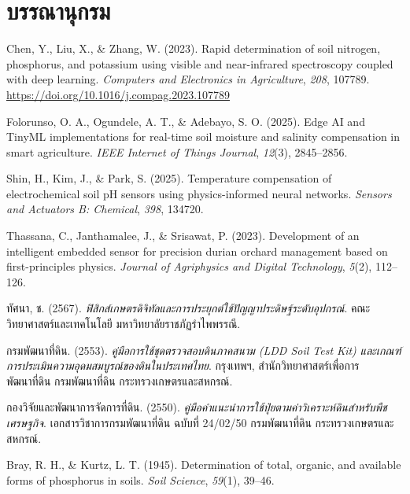 \chapter*{บรรณานุกรม}

\noindent Chen, Y., Liu, X., \& Zhang, W. (2023). Rapid determination of soil nitrogen, phosphorus, and potassium using visible and near-infrared spectroscopy coupled with deep learning. \textit{Computers and Electronics in Agriculture}, \textit{208}, 107789. \url{https://doi.org/10.1016/j.compag.2023.107789}

\vspace{6pt}
\noindent Folorunso, O. A., Ogundele, A. T., \& Adebayo, S. O. (2025). Edge AI and TinyML implementations for real-time soil moisture and salinity compensation in smart agriculture. \textit{IEEE Internet of Things Journal}, \textit{12}(3), 2845--2856.

\vspace{6pt}
\noindent Shin, H., Kim, J., \& Park, S. (2025). Temperature compensation of electrochemical soil pH sensors using physics-informed neural networks. \textit{Sensors and Actuators B: Chemical}, \textit{398}, 134720.

\vspace{6pt}
\noindent Thassana, C., Janthamalee, J., \& Srisawat, P. (2023). Development of an intelligent embedded sensor for precision durian orchard management based on first-principles physics. \textit{Journal of Agriphysics and Digital Technology}, \textit{5}(2), 112--126.

\vspace{6pt}
\noindent ทัศนา, ช. (2567). \textit{ฟิสิกส์เกษตรดิจิทัลและการประยุกต์ใช้ปัญญาประดิษฐ์ระดับอุปกรณ์}. คณะวิทยาศาสตร์และเทคโนโลยี มหาวิทยาลัยราชภัฏรำไพพรรณี.

\vspace{6pt}
\noindent กรมพัฒนาที่ดิน. (2553). \textit{คู่มือการใช้ชุดตรวจสอบดินภาคสนาม (LDD Soil Test Kit) และเกณฑ์การประเมินความอุดมสมบูรณ์ของดินในประเทศไทย}. กรุงเทพฯ, สำนักวิทยาศาสตร์เพื่อการพัฒนาที่ดิน กรมพัฒนาที่ดิน กระทรวงเกษตรและสหกรณ์.

\vspace{6pt}
\noindent กองวิจัยและพัฒนาการจัดการที่ดิน. (2550). \textit{คู่มือคำแนะนำการใช้ปุ๋ยตามค่าวิเคราะห์ดินสำหรับพืชเศรษฐกิจ}. เอกสารวิชาการกรมพัฒนาที่ดิน ฉบับที่ 24/02/50 กรมพัฒนาที่ดิน กระทรวงเกษตรและสหกรณ์.

\vspace{6pt}
\noindent Bray, R. H., \& Kurtz, L. T. (1945). Determination of total, organic, and available forms of phosphorus in soils. \textit{Soil Science}, \textit{59}(1), 39--46.

